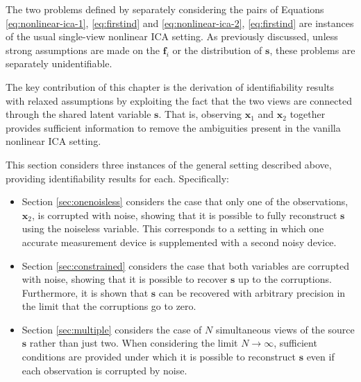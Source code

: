 The two problems defined by separately considering the pairs of Equations \ref{eq:nonlinear-ica-1}, \ref{eq:firstind} and \ref{eq:nonlinear-ica-2}, \ref{eq:firstind} are instances of the usual single-view nonlinear ICA setting.
As previously discussed, unless strong assumptions are made on the $\bm{f}_i$ or the distribution of $\bm{s}$, these problems are separately unidentifiable. 

The key contribution of this chapter is 
the derivation of
identifiability results 
with relaxed assumptions by exploiting the fact that the 
two views are connected through the shared latent variable $\bm{s}$. 
That is, observing $\bm{x}_1$ and $\bm{x}_2$ together provides sufficient information to remove the ambiguities present in the vanilla nonlinear ICA setting.



This section considers three instances of the general setting described above, providing identifiability results for each.
Specifically:
%
\begin{itemize}
	\item Section \ref{sec:onenoisless} considers the case that only one of the observations, $\bm{x}_2$, is corrupted with noise, showing that it is possible to fully reconstruct $\bm{s}$ using the noiseless variable. 
	This corresponds to a setting in which one accurate measurement device is supplemented with a second noisy device. 
	\item Section \ref{sec:constrained} considers the case that both variables are corrupted with noise, showing that it is possible to recover $\bm{s}$ up to the corruptions. 
	Furthermore, it is shown that $\bm{s}$ can be recovered with arbitrary precision in the limit that the corruptions go to zero.
	\item Section \ref{sec:multiple} considers the case of $N$ simultaneous views of the source $\bm{s}$ rather than just two.
	When considering the limit $N \rightarrow \infty$, sufficient conditions are provided under which it is possible to reconstruct $\bm{s}$ even if each observation is corrupted by noise.
\end{itemize}
%


